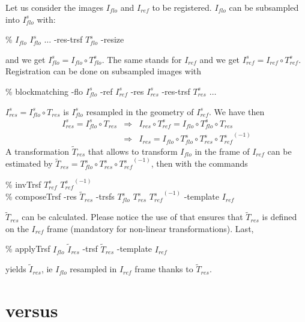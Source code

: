 Let us consider the images $I_{flo}$ and $I_{ref}$ to be registered. $I_{flo}$ can be subsampled into $I^s_{flo}$ with:
\begin{code}{0.8}
\% \applyTrsf $I_{flo}$ $I^s_{flo}$ $\ldots$ -res-trsf $T^s_{flo}$ -resize
\end{code}
and we get $I^s_{flo} = I_{flo} \circ T^s_{flo}$. The same stands for $I_{ref}$ and we get $I^s_{ref} = I_{ref} \circ T^s_{ref}$. Registration can be done on subsampled images with
\begin{code}{0.8}
\% blockmatching -flo $I^s_{flo}$ -ref $I^s_{ref}$ -res $I^s_{res}$ -res-trsf $T^s_{res}$ $\ldots$
\end{code}
$I^s_{res} = I^s_{flo} \circ T_{res}$ is $I^s_{flo}$ resampled in the geometry of $I^s_{ref}$. We have then
\begin{eqnarray*}
I^s_{res} = I^s_{flo} \circ T_{res}
& \Rightarrow &
I_{res} \circ T^s_{ref} = I_{flo} \circ T^s_{flo} \circ T_{res} \\
& \Rightarrow &
I_{res} = I_{flo} \circ T^s_{flo} \circ T^s_{res} \circ {T^s_{ref}}^{(-1)}
\end{eqnarray*}
A transformation $\tilde{T}_{res}$ that allows to transform $I_{flo}$ in the frame of $I_{ref}$ can be estimated by
$\tilde{T}_{res} = T^s_{flo} \circ T^s_{res} \circ {T^s_{ref}}^{(-1)}$, then with the commands
\begin{code}{0.8}
\% invTrsf  $T^s_{ref}$ ${T^s_{ref}}^{(-1)}$ \\
\% composeTrsf -res $\tilde{T}_{res}$ -trsfs $T^s_{flo}$ $T^s_{res}$ ${T^s_{ref}}^{(-1)}$ -template $I_{ref}$
\end{code}
$\tilde{T}_{res}$ can be calculated. Please notice the use of  that ensures that  $\tilde{T}_{res}$  is defined on the $I_{ref}$ frame (mandatory for non-linear transformations).
Last, 
\begin{code}{0.8}
\% applyTrsf $I_{flo}$ $\tilde{I}_{res}$ -trsf  $\tilde{T}_{res}$ -template $I_{ref}$
\end{code}
yields $\tilde{I}_{res}$, ie $I_{flo}$ resampled in $I_{ref}$ frame thanks to $\tilde{T}_{res}$.





\section{\blockmatching versus \baladin}


